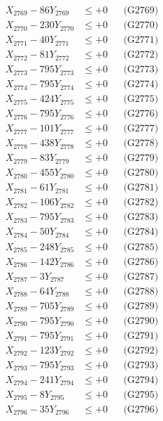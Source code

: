 \documentclass[a4paper,10pt]{article}
\begin{document}
{\begin{align}
X_{2769} - 86Y_{2769} &\leq +0 && \text{(G2769)} \\
X_{2770} - 230Y_{2770} &\leq +0 && \text{(G2770)} \\
\allowbreak
X_{2771} - 40Y_{2771} &\leq +0 && \text{(G2771)} \\
X_{2772} - 81Y_{2772} &\leq +0 && \text{(G2772)} \\
X_{2773} - 795Y_{2773} &\leq +0 && \text{(G2773)} \\
X_{2774} - 795Y_{2774} &\leq +0 && \text{(G2774)} \\
X_{2775} - 424Y_{2775} &\leq +0 && \text{(G2775)} \\
X_{2776} - 795Y_{2776} &\leq +0 && \text{(G2776)} \\
X_{2777} - 101Y_{2777} &\leq +0 && \text{(G2777)} \\
X_{2778} - 438Y_{2778} &\leq +0 && \text{(G2778)} \\
X_{2779} - 83Y_{2779} &\leq +0 && \text{(G2779)} \\
X_{2780} - 455Y_{2780} &\leq +0 && \text{(G2780)} \\
\allowbreak
X_{2781} - 61Y_{2781} &\leq +0 && \text{(G2781)} \\
X_{2782} - 106Y_{2782} &\leq +0 && \text{(G2782)} \\
X_{2783} - 795Y_{2783} &\leq +0 && \text{(G2783)} \\
X_{2784} - 50Y_{2784} &\leq +0 && \text{(G2784)} \\
X_{2785} - 248Y_{2785} &\leq +0 && \text{(G2785)} \\
X_{2786} - 142Y_{2786} &\leq +0 && \text{(G2786)} \\
X_{2787} - 3Y_{2787} &\leq +0 && \text{(G2787)} \\
X_{2788} - 64Y_{2788} &\leq +0 && \text{(G2788)} \\
X_{2789} - 705Y_{2789} &\leq +0 && \text{(G2789)} \\
X_{2790} - 795Y_{2790} &\leq +0 && \text{(G2790)} \\
\allowbreak
X_{2791} - 795Y_{2791} &\leq +0 && \text{(G2791)} \\
X_{2792} - 123Y_{2792} &\leq +0 && \text{(G2792)} \\
X_{2793} - 795Y_{2793} &\leq +0 && \text{(G2793)} \\
X_{2794} - 241Y_{2794} &\leq +0 && \text{(G2794)} \\
X_{2795} - 8Y_{2795} &\leq +0 && \text{(G2795)} \\
X_{2796} - 35Y_{2796} &\leq +0 && \text{(G2796)} \\

\end{align}}
\end{document}
